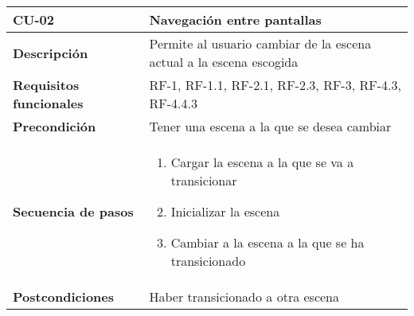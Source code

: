 \begin{tabularx}{\columnwidth}{l|l}
\begin{minipage}{0.25\columnwidth}
\textbf{CU-02} 
\end{minipage}
&
\begin{minipage}{0.65\columnwidth}
Navegación entre pantallas
\end{minipage}
\\ \hline

\begin{minipage}{0.25\columnwidth}
\textbf{Descripción} 
\end{minipage}
&
\begin{minipage}{0.65\columnwidth}
Permite al usuario cambiar de la escena actual a la escena escogida
\end{minipage}
\\ \hline

\begin{minipage}{0.25\columnwidth}
\textbf{Requisitos funcionales} 
\end{minipage}
&
\begin{minipage}{0.65\columnwidth}
RF-1, RF-1.1, RF-2.1, RF-2.3, RF-3, RF-4.3, RF-4.4.3
\end{minipage}
\\ \hline

\begin{minipage}{0.25\columnwidth}
\textbf{Precondición} 
\end{minipage}
&
\begin{minipage}{0.65\columnwidth}
Tener una escena a la que se desea cambiar
\end{minipage}
\\ \hline

\begin{minipage}{0.25\columnwidth}
\textbf{Secuencia de pasos} 
\end{minipage}
&
\begin{minipage}{0.65\columnwidth}
\begin{enumerate}
\item
Cargar la escena a la que se va a transicionar
\item
Inicializar la escena
\item
Cambiar a la escena a la que se ha transicionado
\end{enumerate}
\end{minipage}
\\ \hline

\begin{minipage}{0.25\columnwidth}
\textbf{Postcondiciones} 
\end{minipage}
&
\begin{minipage}{0.65\columnwidth}
Haber transicionado a otra escena
\end{minipage}
\\ \hline


\end{tabularx}
